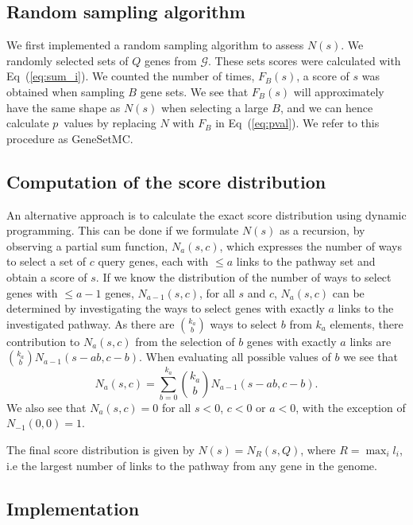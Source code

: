 \documentclass[10pt,letterpaper]{article}
\begin{document}
\subsection*{Random sampling algorithm}

We first implemented a random sampling algorithm to assess $N(s)$. We randomly selected sets of $Q$ genes from $\mathcal{G}$. These sets scores were calculated with Eq~(\ref{eq:sum_i}). We counted the number of times, $F_B(s)$, a score of $s$ was obtained when sampling $B$ gene sets. We see that $F_B(s)$ will approximately have the same shape as $N(s)$ when selecting a large $B$, and we can hence calculate $p$~values by replacing $N$ with $F_B$ in Eq~(\ref{eq:pval}). We refer to this procedure as GeneSetMC.

\subsection*{Computation of the score distribution}

An alternative approach is to calculate the exact score distribution using dynamic programming. This can be done if we formulate $N(s)$ as a recursion, by observing a partial sum function,  $N_a(s,c)$,
 which expresses the number of ways to select a set of $c$ query genes, each with $\le a$  links to the pathway set and obtain a score of $s$. If we know the distribution of the number of ways to select genes with $\le a-1$ genes,  $N_{a-1}(s,c)$, for all $s$ and $c$,   $N_a(s,c)$ can be determined by investigating the ways to select genes with exactly $a$ links to the investigated pathway.   As there are $k_a \choose b$ ways to select $b$ from $k_a$ elements, there contribution to $N_a(s,c)$ from the selection of  $b$ genes with exactly $a$ links are ${k_a \choose b} N_{a-1}(s-ab,c-b)$. When evaluating all possible values of $b$ we see that
 \begin{equation}
N_a(s,c)=\sum_{b=0}^{k_a}{k_a \choose b} N_{a-1}(s-ab,c-b).
\end{equation}
We also see that $N_a(s,c)=0$ for all $s<0$, $c<0$ or $a<0$, with the exception of $N_{-1}(0,0)=1$.

The final score distribution is given by $N(s)=N_R(s,Q)$, where $R=\max_{i}{l_i}$, i.e the largest number of links to the pathway from any gene in the genome.


\subsection*{Implementation}
\end{document}
